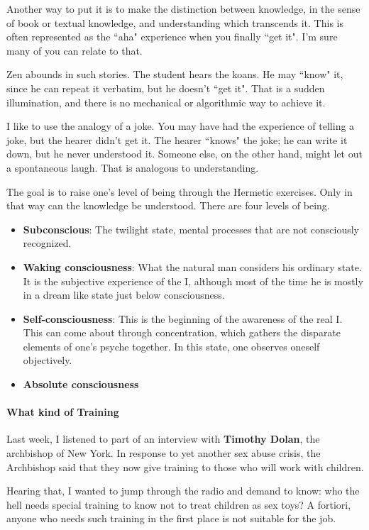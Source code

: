 Another way to put it is to make the distinction between knowledge, in the sense of book or textual knowledge, and
understanding which transcends it. This is often represented as the ``aha" experience when you finally ``get it".
I'm sure many of you can relate to that.

Zen abounds in such stories. The student hears the koans. He may ``know" it, since he can repeat it verbatim, but he
doesn't ``get it". That is a sudden illumination, and there is no mechanical or algorithmic way to
achieve it.

I like to use the analogy of a joke. You may have had the experience of telling a joke, but the hearer
didn't get it. The hearer ``knows" the joke; he can write it down, but he never understood it.
Someone else, on the other hand, might let out a spontaneous laugh. That is analogous to understanding.

The goal is to raise one's level of being through the Hermetic exercises. Only in that way can the
knowledge be understood. There are four levels of being.

\begin{itemize}
\item \textbf{Subconscious}: The twilight state, mental processes that are not consciously recognized. 
\item \textbf{Waking consciousness}: What the natural man considers his ordinary state. It is the subjective experience
of the I, although most of the time he is mostly in a dream like state just below consciousness. 
\item \textbf{Self-consciousness}: This is the beginning of the awareness of the real I. This can come about through
concentration, which gathers the disparate elements of one's psyche together. In this state, one
observes oneself objectively. 
\item \textbf{Absolute consciousness} 
\end{itemize}
\paragraph{What kind of Training}
Last week, I listened to part of an interview with \textbf{Timothy Dolan}, the archbishop of New York. In response to
yet another sex abuse crisis, the Archbishop said that they now give training to those who will work with children.

Hearing that, I wanted to jump through the radio and demand to know: who the hell needs special training to know not to
treat children as sex toys? A fortiori, anyone who needs such training in the first place is not suitable for the job.

